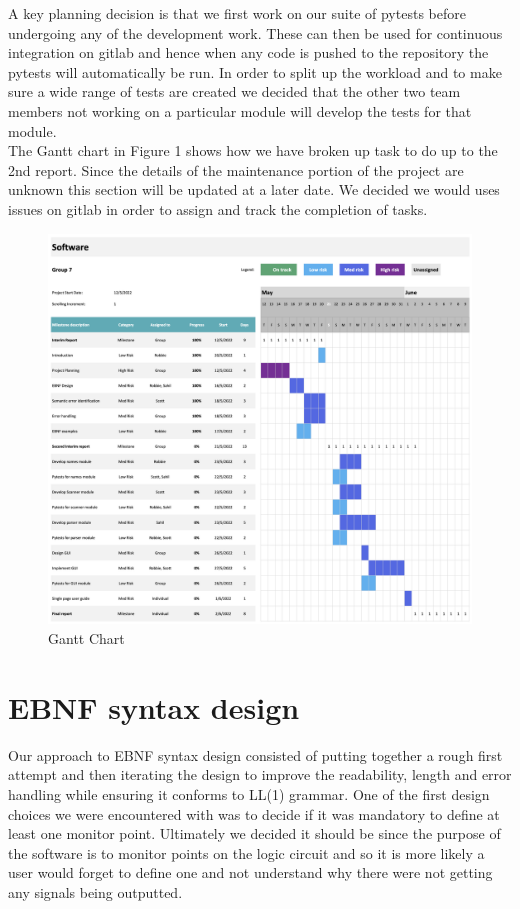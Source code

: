 \documentclass[10pt]{article}
\begin{document}
A key planning decision is that we first work on our suite of pytests before undergoing any of the development work. These can then be used for continuous integration on gitlab and hence when any code is pushed to the repository the pytests will automatically be run. In order to split up the workload and to make sure a wide range of tests are created we decided that the other two team members not working on a particular module will develop the tests for that module.\\

The Gantt chart in Figure 1 shows how we have broken up task to do up to the 2nd report. Since the details of the maintenance portion of the project are unknown this section will be updated at a later date. We decided we would uses issues on gitlab in order to assign and track the completion of tasks.

\begin{figure}[H]
\centering
\captionsetup{justification = centering}
  \includegraphics[width=\linewidth]{Gantt.png}
  \caption{Gantt Chart}
\end{figure}

\newpage
\section{EBNF syntax design}
Our approach to EBNF syntax design consisted of putting together a rough first attempt and then iterating the design to improve the readability, length and error handling while ensuring it conforms to LL(1) grammar. One of the first design choices we were encountered with was to decide if it was mandatory to define at least one monitor point. Ultimately we decided it should be since the purpose of the software is to monitor points on the logic circuit and so it is more likely a user would forget to define one and not understand why there were not getting any signals being outputted. \\
\end{document}
